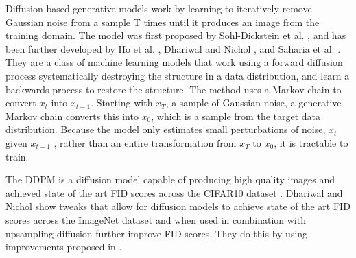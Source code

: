 \documentclass{UoYCSproject}
\begin{document}
Diffusion based generative models work by learning to iteratively remove Gaussian noise from a sample T times until it produces an image from the training domain. The model was first proposed by Sohl-Dickstein et al. \cite{sohldickstein2015deep}, and has been further developed by Ho et al. \cite{ho2020denoising},  Dhariwal and Nichol \cite{dhariwal2021diffusion}, and Saharia et al. \cite{saharia2022palette}. They are a class of machine learning models that work using a forward diffusion process systematically destroying the structure in a data distribution, and learn a backwards process to restore the structure. The method uses a Markov chain to convert $ x_t $ into $ x_{t-1} $. Starting with $ x_T $, a sample of Gaussian noise, a generative Markov chain converts this into $ x_0 $, which is a sample from the target data distribution. Because the model only estimates small perturbations of noise, $ x_t $ given $ x_{t-1} $ , rather than an entire transformation from $ x_T $ to $ x_0 $, it is tractable to train. 

The DDPM is a diffusion model capable of producing high quality images and achieved state of the art FID scores across the CIFAR10 dataset \cite{ho2020denoising}. Dhariwal and Nichol \cite{dhariwal2021diffusion} show tweaks that allow for diffusion models to achieve state of the art FID scores across the ImageNet dataset and when used in combination with upsampling diffusion further improve FID scores. They do this by using improvements proposed in \cite{song2022denoising, nichol2021improved, song2021scorebased, brock2019large, karras2019stylebased}.


\end{document}
